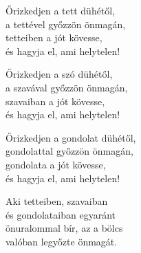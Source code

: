 \begin{dhpverse}

 Őrizkedjen a tett dühétől,\\
a tettével győzzön önmagán,\\
tetteiben a jót kövesse,\\
és hagyja el, ami helytelen!

 Őrizkedjen a szó dühétől,\\
a szavával győzzön önmagán,\\
szavaiban a jót kövesse,\\
és hagyja el, ami helytelen!

 Őrizkedjen a gondolat dühétől,\\
gondolattal győzzön önmagán,\\
gondolata a jót kövesse,\\
és hagyja el, ami helytelen!

 Aki tetteiben, szavaiban\\
és gondolataiban egyaránt\\
önuralommal bír, az a bölcs\\
valóban legyőzte önmagát.

\end{dhpverse}
